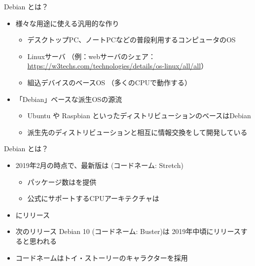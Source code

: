 \begin{frame}{Debian とは？}

\begin{itemize}
  \item 様々な用途に使える汎用的な作り
    \begin{itemize}
    \item デスクトップPC、ノートPCなどの普段利用するコンピュータのOS
    \item Linuxサーバ （例：webサーバのシェア：\url{https://w3techs.com/technologies/details/os-linux/all/all}）
    \item 組込デバイスのベースOS （多くのCPUで動作する）
  \end{itemize}
  \item 「Debian」ベースな派生OSの源流
  \begin{itemize}
    \item Ubuntu や Raspbian といったディストリビューションのベースはDebian
    \item 派生先のディストリビューションと相互に情報交換をして開発している
  \end{itemize}
\end{itemize}

\end{frame}


\begin{frame}{Debian とは？}

\begin{itemize}
  \item 2019年2月の時点で、最新版は {\color{red}{Debian 9.8}} (コードネーム: Stretch)
  \begin{itemize}
    \item パッケージ数は{\color{red}{約51000}}を提供
    \item 公式にサポートするCPUアーキテクチャは{\color{red}{10}}
  \end{itemize}
  \item {\color{red}{約2年毎}}にリリース
  \item 次のリリース Debian 10 (コードネーム: {\color{red}{}}Buster)は 2019年中頃にリリースすると思われる
  \item コードネームはトイ・ストーリーのキャラクターを採用
\end{itemize}

\end{frame}


